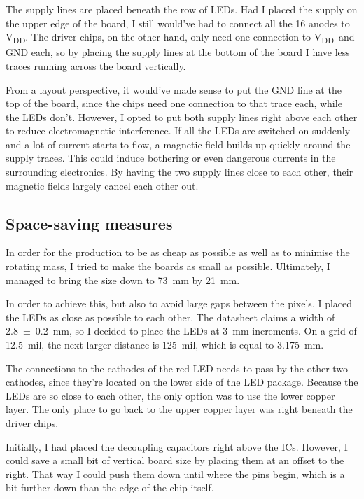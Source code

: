\documentclass[a4paper, 11pt, titlepage]{report}
\def \vdd {V\textsubscript{DD}}
\begin{document}
The supply lines are placed beneath the row of LEDs. Had I placed the supply on the upper edge of
the board, I still would've had to connect all the 16 anodes to \vdd. The driver chips, on the
other hand, only need one connection to \vdd\ and GND each, so by placing the supply lines at the
bottom of the board I have less traces running across the board vertically.

From a layout perspective, it would've made sense to put the GND line at the top of the board,
since the chips need one connection to that trace each, while the LEDs don't. However, I opted to
put both supply lines right above each other to reduce electromagnetic interference. If all the
LEDs are switched on suddenly and a lot of current starts to flow, a magnetic field builds up
quickly around the supply traces. This could induce bothering or even dangerous currents in the
surrounding electronics. By having the two supply lines close to each other, their magnetic fields
largely cancel each other out.


\subsection{Space-saving measures}

In order for the production to be as cheap as possible as well as to minimise the rotating mass, I
tried to make the boards as small as possible. Ultimately, I managed to bring the size down to
\SI{73}{\milli\meter} by \SI{21}{\milli\meter}.

In order to achieve this, but also to avoid large gaps between the pixels, I placed the LEDs as
close as possible to each other. The datasheet claims a width of \SI{2.8 \pm 0.2}{\milli\meter},
so I decided to place the LEDs at \SI{3}{\milli\metre} increments. On a grid of \SI{12.5}{mil},
the next larger distance is \SI{125}{mil}, which is equal to \SI{3.175}{mm}.

The connections to the cathodes of the red LED needs to pass by the other two cathodes, since
they're located on the lower side of the LED package. Because the LEDs are so close to each other,
the only option was to use the lower copper layer. The only place to go back to the upper copper
layer was right beneath the driver chips.

Initially, I had placed the decoupling capacitors right above the ICs. However, I could save a
small bit of vertical board size by placing them at an offset to the right. That way I could push
them down until where the pins begin, which is a bit further down than the edge of the chip
itself.
\end{document}
